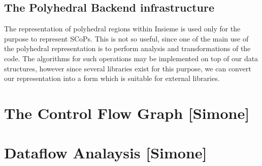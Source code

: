 \subsection{The Polyhedral Backend infrastructure}

The representation of polyhedral regions within Insieme is used only for the
purpose to represent SCoPs. This is not so useful, since one of the main use of
the polyhedral representation is to perform analysis and transformations of the
code. The algorithms for such operations may be implemented on top of our data
structures, however since several libraries exist for this purpose, we can
convert our representation into a form which is suitable for external libraries. 







\section{The Control Flow Graph [Simone]}
\label{insieme:analysis:cfg}



\section{Dataflow Analaysis [Simone]}
\label{insieme:analysis:dtaflow}
